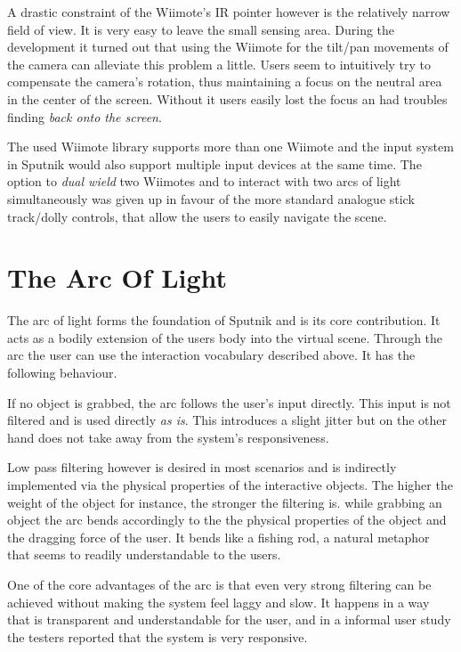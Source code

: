 \documentclass[10pt,a4paper]{scrartcl}
\begin{document}
A drastic constraint of the Wiimote's IR pointer however is the relatively narrow field of view. It is very easy to leave the small sensing area. During the development it turned out that using the Wiimote for the tilt/pan movements of the camera can alleviate this problem a little. Users seem to intuitively try to compensate the camera's rotation, thus maintaining a focus on the neutral area in the center of the screen. Without it users easily lost the focus an had troubles finding \emph{back onto the screen}.

The used Wiimote library supports more than one Wiimote and the input system in Sputnik would also support multiple input devices at the same time. The option to \emph{dual wield} two Wiimotes and to interact with two arcs of light simultaneously was given up in favour of the more standard analogue stick track/dolly controls, that allow the users to easily navigate the scene. 





\section{The Arc Of Light}
The arc of light forms the foundation of Sputnik and is its core contribution. It acts as a bodily extension of the users body into the virtual scene. Through the arc the user can use the interaction vocabulary described above. It has the following behaviour.

If no object is grabbed, the arc follows the user's input directly. This input is not filtered and is used directly \emph{as is}. This introduces a slight jitter but on the other hand does not take away from the system's responsiveness. 

Low pass filtering however is desired in most scenarios and is indirectly implemented via the physical properties of the interactive objects. The higher the weight of the object for instance, the stronger the filtering is. while grabbing an object the arc bends accordingly to the the physical properties of the object and the dragging force of the user. It bends like a fishing rod, a natural metaphor that seems to readily understandable to the users.

One of the core advantages of the arc is that even very strong filtering can be achieved without making the system feel laggy and slow. It happens in a way that is transparent and understandable for the user, and in a informal user study the testers reported that the system is very responsive.
\end{document}
